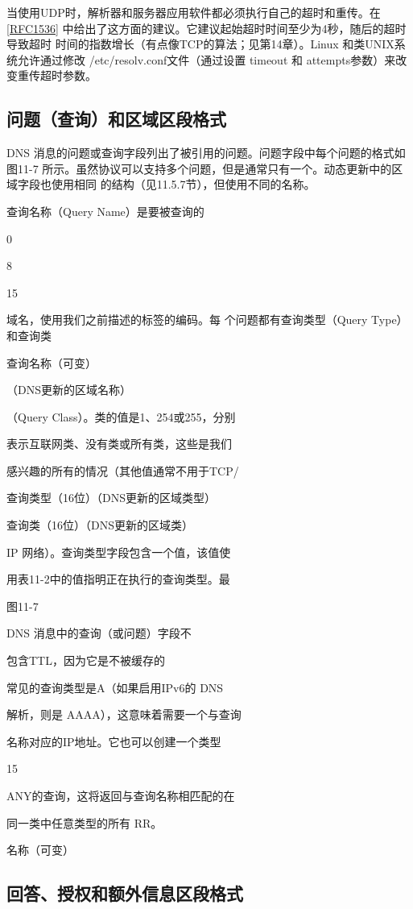 当使用UDP时，解析器和服务器应用软件都必须执行自己的超时和重传。在
\href{https://www.rfc-editor.org/rfc/rfc1536}{[RFC1536]} 中给出了这方面的建议。它建议起始超时时间至少为4秒，随后的超时导致超时
时间的指数增长（有点像TCP的算法；见第14章）。Linux 和类UNIX系统允许通过修改
/etc/resolv.conf文件（通过设置 timeout 和 attempts参数）来改变重传超时参数。

\subsection{问题（查询）和区域区段格式}

DNS 消息的问题或查询字段列出了被引用的问题。问题字段中每个问题的格式如图11-7
所示。虽然协议可以支持多个问题，但是通常只有一个。动态更新中的区域字段也使用相同
的结构（见11.5.7节），但使用不同的名称。

查询名称（Query Name）是要被查询的

0

8

15

域名，使用我们之前描述的标签的编码。每
个问题都有查询类型（Query Type） 和查询类

查询名称（可变）

（DNS更新的区域名称）

（Query Class）。类的值是1、254或255，分别

表示互联网类、没有类或所有类，这些是我们

感兴趣的所有的情况（其他值通常不用于TCP/

查询类型（16位）（DNS更新的区域类型）

查询类（16位）（DNS更新的区域类）

IP 网络）。查询类型字段包含一个值，该值使

用表11-2中的值指明正在执行的查询类型。最

图11-7

DNS 消息中的查询（或问题）字段不

包含TTL，因为它是不被缓存的

常见的查询类型是A（如果启用IPv6的 DNS

解析，则是 AAAA），这意味着需要一个与查询

名称对应的IP地址。它也可以创建一个类型

15

ANY的查询，这将返回与查询名称相匹配的在

同一类中任意类型的所有 RR。

名称（可变）

\subsection{回答、授权和额外信息区段格式}

